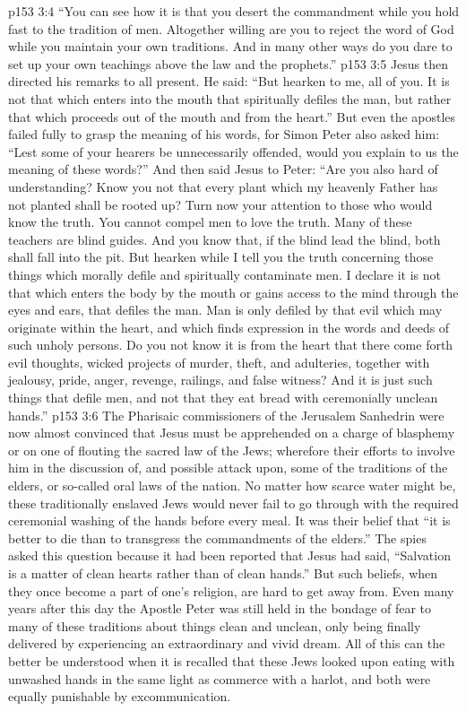 \vs p153 3:4 \textcolor{ubdarkred}{“You can see how it is that you desert the commandment while you hold fast to the tradition of men. Altogether willing are you to reject the word of God while you maintain your own traditions. And in many other ways do you dare to set up your own teachings above the law and the prophets.”}
\vs p153 3:5 Jesus then directed his remarks to all present. He said: “But hearken to me, all of you. It is not that which enters into the mouth that spiritually defiles the man, but rather that which proceeds out of the mouth and from the heart.” But even the apostles failed fully to grasp the meaning of his words, for Simon Peter also asked him: “Lest some of your hearers be unnecessarily offended, would you explain to us the meaning of these words?” And then said Jesus to Peter: \textcolor{ubdarkred}{“Are you also hard of understanding? Know you not that every plant which my heavenly Father has not planted shall be rooted up? Turn now your attention to those who would know the truth. You cannot compel men to love the truth. Many of these teachers are blind guides. And you know that, if the blind lead the blind, both shall fall into the pit. But hearken while I tell you the truth concerning those things which morally defile and spiritually contaminate men. I declare it is not that which enters the body by the mouth or gains access to the mind through the eyes and ears, that defiles the man. Man is only defiled by that evil which may originate within the heart, and which finds expression in the words and deeds of such unholy persons. Do you not know it is from the heart that there come forth evil thoughts, wicked projects of murder, theft, and adulteries, together with jealousy, pride, anger, revenge, railings, and false witness? And it is just such things that defile men, and not that they eat bread with ceremonially unclean hands.”}\plusone
\vs p153 3:6 The Pharisaic commissioners of the Jerusalem Sanhedrin were now almost convinced that Jesus must be apprehended on a charge of blasphemy or on one of flouting the sacred law of the Jews; wherefore their efforts to involve him in the discussion of, and possible attack upon, some of the traditions of the elders, or so\hyp{}called oral laws of the nation. No matter how scarce water might be, these traditionally enslaved Jews would never fail to go through with the required ceremonial washing of the hands before every meal. It was their belief that “it is better to die than to transgress the commandments of the elders.” The spies asked this question because it had been reported that Jesus had said, “Salvation is a matter of clean hearts rather than of clean hands.” But such beliefs, when they once become a part of one’s religion, are hard to get away from. Even many years after this day the Apostle Peter was still held in the bondage of fear to many of these traditions about things clean and unclean, only being finally delivered by experiencing an extraordinary and vivid dream. All of this can the better be understood when it is recalled that these Jews looked upon eating with unwashed hands in the same light as commerce with a harlot, and both were equally punishable by excommunication.

